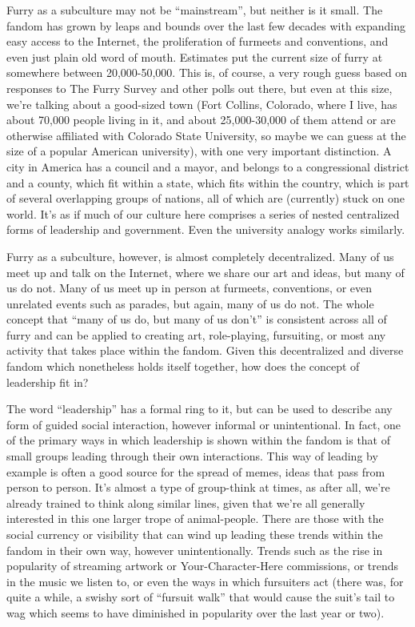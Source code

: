 
Furry as a subculture may not be ``mainstream'', but neither is it small. The fandom has grown by leaps and bounds over the last few decades with expanding easy access to the Internet, the proliferation of furmeets and conventions, and even just plain old word of mouth. Estimates put the current size of furry at somewhere between 20,000-50,000. This is, of course, a very rough guess based on responses to The Furry Survey and other polls out there, but even at this size, we’re talking about a good-sized town (Fort Collins, Colorado, where I live, has about 70,000 people living in it, and about 25,000-30,000 of them attend or are otherwise affiliated with Colorado State University, so maybe we can guess at the size of a popular American university), with one very important distinction. A city in America has a council and a mayor, and belongs to a congressional district and a county, which fit within a state, which fits within the country, which is part of several overlapping groups of nations, all of which are (currently) stuck on one world. It’s as if much of our culture here comprises a series of nested centralized forms of leadership and government. Even the university analogy works similarly.

Furry as a subculture, however, is almost completely decentralized. Many of us meet up and talk on the Internet, where we share our art and ideas, but many of us do not. Many of us meet up in person at furmeets, conventions, or even unrelated events such as parades, but again, many of us do not. The whole concept that ``many of us do, but many of us don’t'' is consistent across all of furry and can be applied to creating art, role-playing, fursuiting, or most any activity that takes place within the fandom. Given this decentralized and diverse fandom which nonetheless holds itself together, how does the concept of leadership fit in?

The word ``leadership'' has a formal ring to it, but can be used to describe any form of guided social interaction, however informal or unintentional. In fact, one of the primary ways in which leadership is shown within the fandom is that of small groups leading through their own interactions. This way of leading by example is often a good source for the spread of memes, ideas that pass from person to person. It’s almost a type of group-think at times, as after all, we’re already trained to think along similar lines, given that we’re all generally interested in this one larger trope of animal-people. There are those with the social currency or visibility that can wind up leading these trends within the fandom in their own way, however unintentionally. Trends such as the rise in popularity of streaming artwork or Your-Character-Here commissions, or trends in the music we listen to, or even the ways in which fursuiters act (there was, for quite a while, a swishy sort of ``fursuit walk'' that would cause the suit’s tail to wag which seems to have diminished in popularity over the last year or two).

